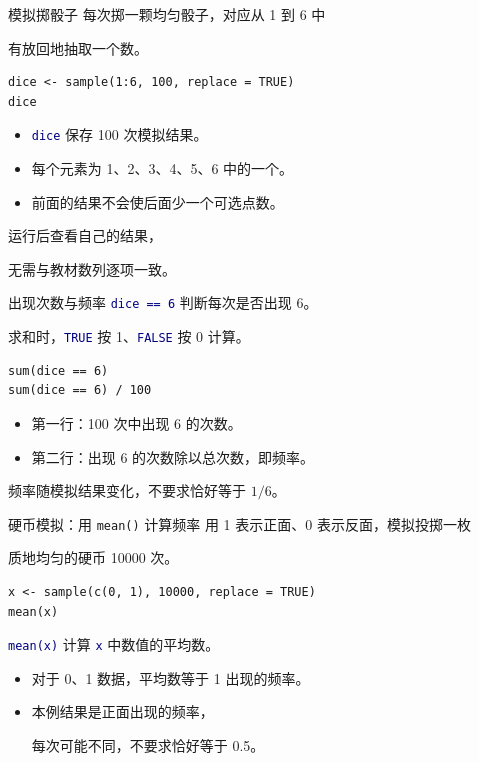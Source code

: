 \documentclass[14pt,compress,t,noamsthm,notheorem,table,handout,fontset=none]{ctexbeamer}
\newcommand{\code}[1]{\textcolor{navy}{\texttt{#1}}}
\newcommand{\inputlabel}{\par\smallskip{\fontsize{10.5}{13}\selectfont\bfseries\color{muted}输入代码\par}}
\begin{document}
\begin{frame}[fragile]{模拟掷骰子}
  每次掷一颗均匀骰子，对应从 1 到 6 中\par
  有放回地抽取一个数。
  \inputlabel
\begin{lstlisting}
dice <- sample(1:6, 100, replace = TRUE)
dice
\end{lstlisting}
  \begin{itemize}
    \item \code{dice} 保存 100 次模拟结果。
    \item 每个元素为 1、2、3、4、5、6 中的一个。
    \item 前面的结果不会使后面少一个可选点数。
  \end{itemize}
  运行后查看自己的结果，\par
  无需与教材数列逐项一致。
\end{frame}

\begin{frame}[fragile]{出现次数与频率}
  \code{dice == 6} 判断每次是否出现 6。\par
  求和时，\code{TRUE} 按 1、\code{FALSE} 按 0 计算。
  \inputlabel
\begin{lstlisting}
sum(dice == 6)
sum(dice == 6) / 100
\end{lstlisting}
  \begin{itemize}
    \item 第一行：100 次中出现 6 的次数。
    \item 第二行：出现 6 的次数除以总次数，即频率。
  \end{itemize}
  频率随模拟结果变化，不要求恰好等于 $1/6$。
\end{frame}

\begin{frame}[fragile]{硬币模拟：用 \texttt{mean()} 计算频率}
  用 1 表示正面、0 表示反面，模拟投掷一枚\par
  质地均匀的硬币 10000 次。
  \inputlabel
\begin{lstlisting}
x <- sample(c(0, 1), 10000, replace = TRUE)
mean(x)
\end{lstlisting}
  \code{mean(x)} 计算 \code{x} 中数值的平均数。
  \begin{itemize}
    \item 对于 0、1 数据，平均数等于 1 出现的频率。
    \item 本例结果是正面出现的频率，\par
      每次可能不同，不要求恰好等于 0.5。
  \end{itemize}
\end{frame}
\end{document}
